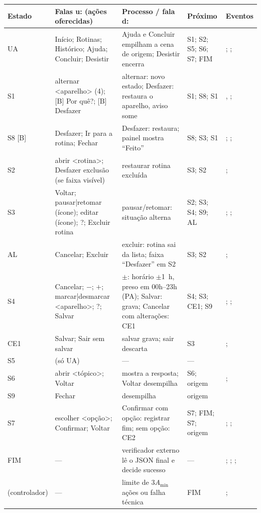 \begin{tabularx}{\textwidth}{@{}P{1.4cm}P{3.8cm}YP{1.8cm}P{3.2cm}@{}}
\toprule
\textbf{Estado} & \textbf{Falas u: (ações oferecidas)} & \textbf{Processo / fala d:} & \textbf{Próximo} & \textbf{Eventos} \\
\midrule
UA & Início; Rotinas; Histórico; Ajuda; Concluir; Desistir & Ajuda e Concluir empilham a cena de origem; Desistir encerra & S1; S2; S5; S6; S7; FIM & ; ;  \\
S1 & alternar <aparelho> (4); [B] Por quê?; [B] Desfazer & alternar: novo estado; Desfazer: restaura o aparelho, aviso some & S1; S8; S1 & , ;  \\
S8 [B] & Desfazer; Ir para a rotina; Fechar & Desfazer: restaura; painel mostra ``Feito'' & S8; S3; S1 & ; ;  \\
S2 & abrir <rotina>; Desfazer exclusão (se faixa visível) & restaurar rotina excluída & S3; S2 & ;  \\
S3 & Voltar; pausar|retomar (ícone); editar (ícone); ?; Excluir rotina & pausar/retomar: situação alterna & S2; S3; S4; S9; AL & ; ;  \\
AL & Cancelar; Excluir & excluir: rotina sai da lista; faixa ``Desfazer'' em S2 & S3; S2 & ;  \\
S4 & Cancelar; $-$; $+$; marcar|desmarcar <aparelho>; ?; Salvar & $\pm$: horário $\pm$1~h, preso em 00h--23h (PA); Salvar: grava; Cancelar com alterações: CE1 & S4; S3; CE1; S9 & ; ;  \\
CE1 & Salvar; Sair sem salvar & salvar grava; sair descarta & S3 & ;  \\
S5 & (só UA) & --- & --- &  \\
S6 & abrir <tópico>; Voltar & mostra a resposta; Voltar desempilha & S6; origem & ;  \\
S9 & Fechar & desempilha & origem &  \\
S7 & escolher <opção>; Confirmar; Voltar & Confirmar com opção: registrar fim; sem opção: CE2 & S7; FIM; S7; origem & ; ;  \\
FIM & --- & verificador externo lê o JSON final e decide sucesso & --- & ; ; ;  \\
(controlador) & --- & limite de $3A_{\min}$ ações ou falha técnica & FIM & ;  \\
\bottomrule
\end{tabularx}
